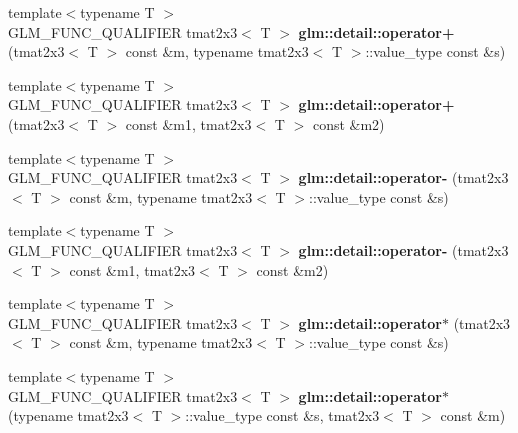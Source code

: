 \begin{DoxyCompactItemize}
\item 
\hypertarget{namespaceglm_1_1detail_a64384ac6e361d06263b559da9a0198d2}{{\footnotesize template$<$typename T $>$ }\\G\-L\-M\-\_\-\-F\-U\-N\-C\-\_\-\-Q\-U\-A\-L\-I\-F\-I\-E\-R tmat2x3$<$ T $>$ {\bfseries glm\-::detail\-::operator+} (tmat2x3$<$ T $>$ const \&m, typename tmat2x3$<$ T $>$\-::value\-\_\-type const \&s)}\label{namespaceglm_1_1detail_a64384ac6e361d06263b559da9a0198d2}

\item 
\hypertarget{namespaceglm_1_1detail_a75ffbdb3efd2991c406debd80bdcd77e}{{\footnotesize template$<$typename T $>$ }\\G\-L\-M\-\_\-\-F\-U\-N\-C\-\_\-\-Q\-U\-A\-L\-I\-F\-I\-E\-R tmat2x3$<$ T $>$ {\bfseries glm\-::detail\-::operator+} (tmat2x3$<$ T $>$ const \&m1, tmat2x3$<$ T $>$ const \&m2)}\label{namespaceglm_1_1detail_a75ffbdb3efd2991c406debd80bdcd77e}

\item 
\hypertarget{namespaceglm_1_1detail_ae2b907884e410f8a90523508f46eca76}{{\footnotesize template$<$typename T $>$ }\\G\-L\-M\-\_\-\-F\-U\-N\-C\-\_\-\-Q\-U\-A\-L\-I\-F\-I\-E\-R tmat2x3$<$ T $>$ {\bfseries glm\-::detail\-::operator-\/} (tmat2x3$<$ T $>$ const \&m, typename tmat2x3$<$ T $>$\-::value\-\_\-type const \&s)}\label{namespaceglm_1_1detail_ae2b907884e410f8a90523508f46eca76}

\item 
\hypertarget{namespaceglm_1_1detail_a756bdeeaa7ef14e6de45eea915bf16b2}{{\footnotesize template$<$typename T $>$ }\\G\-L\-M\-\_\-\-F\-U\-N\-C\-\_\-\-Q\-U\-A\-L\-I\-F\-I\-E\-R tmat2x3$<$ T $>$ {\bfseries glm\-::detail\-::operator-\/} (tmat2x3$<$ T $>$ const \&m1, tmat2x3$<$ T $>$ const \&m2)}\label{namespaceglm_1_1detail_a756bdeeaa7ef14e6de45eea915bf16b2}

\item 
\hypertarget{namespaceglm_1_1detail_a692e2df3516c96bec24a573b97d19ce7}{{\footnotesize template$<$typename T $>$ }\\G\-L\-M\-\_\-\-F\-U\-N\-C\-\_\-\-Q\-U\-A\-L\-I\-F\-I\-E\-R tmat2x3$<$ T $>$ {\bfseries glm\-::detail\-::operator$\ast$} (tmat2x3$<$ T $>$ const \&m, typename tmat2x3$<$ T $>$\-::value\-\_\-type const \&s)}\label{namespaceglm_1_1detail_a692e2df3516c96bec24a573b97d19ce7}

\item 
\hypertarget{namespaceglm_1_1detail_a627e509d125f3a9a29a68e5c60efb362}{{\footnotesize template$<$typename T $>$ }\\G\-L\-M\-\_\-\-F\-U\-N\-C\-\_\-\-Q\-U\-A\-L\-I\-F\-I\-E\-R tmat2x3$<$ T $>$ {\bfseries glm\-::detail\-::operator$\ast$} (typename tmat2x3$<$ T $>$\-::value\-\_\-type const \&s, tmat2x3$<$ T $>$ const \&m)}\label{namespaceglm_1_1detail_a627e509d125f3a9a29a68e5c60efb362}


\end{DoxyCompactItemize}
